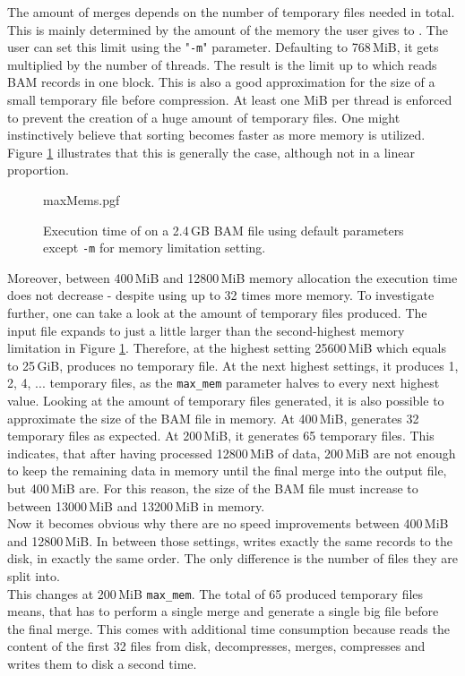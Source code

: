 The amount of merges depends on the number of temporary files needed in total. This is mainly determined by the amount of the memory the user gives to \sort. The user can set this limit using the "\texttt{-m}" parameter. Defaulting to 768\,MiB, it gets multiplied by the number of threads. The result is the limit up to which \sort reads BAM records in one block. This is also a good approximation for the size of a small temporary file before compression. At least one MiB per thread is enforced to prevent the creation of a huge amount of temporary files. One might instinctively believe that sorting becomes faster as more memory is utilized. Figure \ref{fig:maxMems} illustrates that this is generally the case, although not in a linear proportion.
\begin{figure}
        {maxMems.pgf}
    \caption{Execution time of \sort on a 2.4\,GB BAM file using default parameters except \texttt{-m} for memory limitation setting. }
    \label{fig:maxMems}
\end{figure}
Moreover, between 400\,MiB and 12800\,MiB memory allocation the execution time does not decrease - despite \sort using up to 32 times more memory. To investigate further, one can take a look at the amount of temporary files produced. The input file expands to just a little larger than the second-highest memory limitation in Figure \ref{fig:maxMems}. Therefore, at the highest setting 25600\,MiB which equals to 25\,GiB, \sort produces no temporary file. At the next highest settings, it produces 1, 2, 4, ... temporary files, as the \texttt{max\_mem} parameter halves to every next highest value. Looking at the amount of temporary files generated, it is also possible to approximate the size of the BAM file in memory. At 400\,MiB, \sort generates 32 temporary files as expected. At 200\,MiB, it generates 65 temporary files. This indicates, that after having processed 12800\,MiB of data, 200\,MiB are not enough to keep the remaining data in memory until the final merge into the output file, but 400\,MiB are. For this reason, the size of the BAM file must increase to between 13000\,MiB and 13200\,MiB in memory. \\
Now it becomes obvious why there are no speed improvements between 400\,MiB and 12800\,MiB. In between those settings, \sort writes exactly the same records to the disk, in exactly the same order. The only difference is the number of files they are split into. \\
This changes at 200\,MiB \texttt{max\_mem}. The total of 65 produced temporary files means, that \sort has to perform a single merge and generate a single big file before the final merge. This comes with additional time consumption because \sort reads the content of the first 32 files from disk, decompresses, merges, compresses  and writes them to disk a second time. \\
